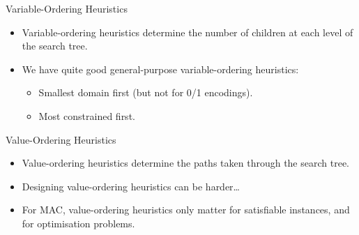 \documentclass{beamer}
\begin{document}
\begin{frame}{Variable-Ordering Heuristics}
    \begin{itemize}
        \item Variable-ordering heuristics determine the number of children at each level of the
            search tree.
        \item We have quite good general-purpose variable-ordering heuristics:
            \begin{itemize}
                \item Smallest domain first (but not for 0/1 encodings).
                \item Most constrained first.
            \end{itemize}
    \end{itemize}
\end{frame}

\begin{frame}{Value-Ordering Heuristics}
    \begin{itemize}
        \item Value-ordering heuristics determine the paths taken through the search tree.
        \item Designing value-ordering heuristics can be harder\ldots
        \item For MAC, value-ordering heuristics only matter for satisfiable instances, and for
            optimisation problems.
    \end{itemize}
\end{frame}
\end{document}

